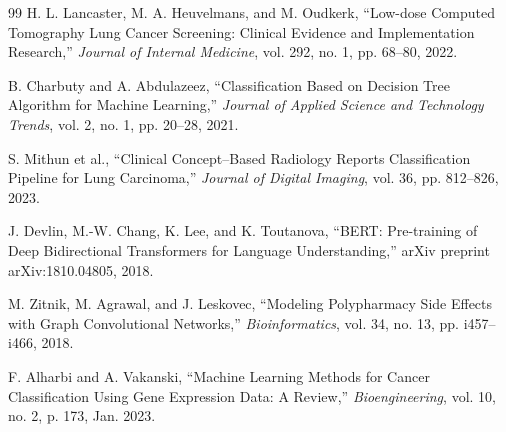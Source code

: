 \documentclass[a4paper,12pt]{report}
\begin{document}
\begin{thebibliography}{99}
H. L. Lancaster, M. A. Heuvelmans, and M. Oudkerk, ``Low-dose Computed Tomography Lung Cancer Screening: Clinical Evidence and Implementation Research,'' \textit{Journal of Internal Medicine}, vol. 292, no. 1, pp. 68--80, 2022.

B. Charbuty and A. Abdulazeez, ``Classification Based on Decision Tree Algorithm for Machine Learning,'' \textit{Journal of Applied Science and Technology Trends}, vol. 2, no. 1, pp. 20--28, 2021.

S. Mithun et al., ``Clinical Concept–Based Radiology Reports Classification Pipeline for Lung Carcinoma,'' \textit{Journal of Digital Imaging}, vol. 36, pp. 812--826, 2023.

J. Devlin, M.-W. Chang, K. Lee, and K. Toutanova, ``BERT: Pre-training of Deep Bidirectional Transformers for Language Understanding,'' arXiv preprint arXiv:1810.04805, 2018.

M. Zitnik, M. Agrawal, and J. Leskovec, ``Modeling Polypharmacy Side Effects with Graph Convolutional Networks,'' \textit{Bioinformatics}, vol. 34, no. 13, pp. i457--i466, 2018.

F. Alharbi and A. Vakanski, ``Machine Learning Methods for Cancer Classification Using Gene Expression Data: A Review,'' \textit{Bioengineering}, vol. 10, no. 2, p. 173, Jan. 2023.

\end{thebibliography}
\end{document}
